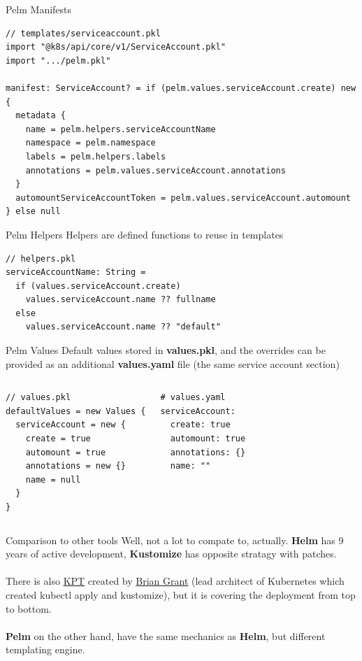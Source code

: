\documentclass[11pt, aspectratio=169]{beamer}
\begin{document}
\begin{frame}[fragile]{ Pelm Manifests}
	\begin{verbatim}
// templates/serviceaccount.pkl
import "@k8s/api/core/v1/ServiceAccount.pkl"
import ".../pelm.pkl"

manifest: ServiceAccount? = if (pelm.values.serviceAccount.create) new {
  metadata {
    name = pelm.helpers.serviceAccountName
    namespace = pelm.namespace
    labels = pelm.helpers.labels
    annotations = pelm.values.serviceAccount.annotations
  }
  automountServiceAccountToken = pelm.values.serviceAccount.automount
} else null
	\end{verbatim}
\end{frame}

\begin{frame}[fragile]{ Pelm Helpers}
	Helpers are defined functions to reuse in templates
	\begin{verbatim}
// helpers.pkl
serviceAccountName: String =
  if (values.serviceAccount.create)
    values.serviceAccount.name ?? fullname
  else
    values.serviceAccount.name ?? "default"
	\end{verbatim}
\end{frame}

\begin{frame}[fragile]{ Pelm Values}
	Default values stored in \textbf{values.pkl}, and the overrides can be
	provided as an additional \textbf{values.yaml} file
	(the same service account section)

	\begin{columns}
		\begin{verbatim}
// values.pkl
defaultValues = new Values {
  serviceAccount = new {
    create = true
    automount = true
    annotations = new {}
    name = null
  }
}
		\end{verbatim}

		\begin{verbatim}
# values.yaml
serviceAccount:
  create: true
  automount: true
  annotations: {}
  name: ""
		\end{verbatim}
	\end{columns}
\end{frame}

\begin{frame}{ Comparison to other tools}
	Well, not a lot to compate to, actually.
	\textbf{Helm} has 9 years of active development,
	\textbf{Kustomize} has opposite stratagy with patches.\\~\\
	There is also \href{https://github.com/kptdev/kpt}{KPT} created by
	\href{https://github.com/bgrant0607}{Brian Grant}
	(lead architect of Kubernetes which created kubectl apply and kustomize),
	but it is covering the deployment from top to bottom.\\~\\
	\textbf{Pelm} on the other hand, have the same mechanics as \textbf{Helm},
	but different templating engine.
\end{frame}
\end{document}
